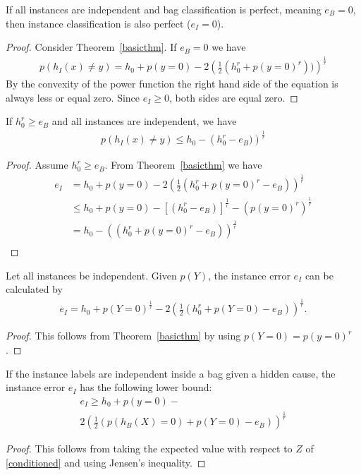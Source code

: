 \begin{corollarya}
If all instances are independent and bag classification is perfect, meaning $e_B=0$, then instance classification is also perfect ($e_I =0$).

\begin{proof}
Consider Theorem~\ref{basicthm}. If $e_B=0$ we have
\begin{align*}
p(h_I(x) \neq y) = h_0 + p(y=0) - 2 \left (\frac{1}{2} ( h_0^r + p(y=0)^r)) \right)^\frac{1}{r}
\end{align*}
By the convexity of the power function the right hand side of the equation is always less or equal zero.
Since $e_I \geq 0$, both sides are equal zero.
\end{proof}
\end{corollarya}

\begin{theorema}
    If $h_0^r  \geq e_B$ and all instances are independent, we have
\begin{align}
    p(h_I(x)\neq y) \leq h_0 - \left ( h_0^r - e_B) \right ) ^ \frac{1}{r}
\end{align}
\begin{proof}
    Assume $h_0^r  \geq e_B$.
    From Theorem~\ref{basicthm} we have
\begin{align*}
   e_I &= h_0 + p(y=0) - 2 \left (\frac{1}{2} ( h_0^r + p(y=0)^r - e_B) \right)^\frac{1}{r}\\
   &\leq h_0 + p(y=0) - \left [( h_0^r - e_B) \right]^\frac{1}{r}
   - \left ( p(y=0)^r \right )^\frac{1}{r}\\
   &= h_0 - \left (( h_0^r + p(y=0)^r - e_B) \right)^\frac{1}{r}\\
\end{align*}
\end{proof}
\end{theorema}

\begin{theorema}
Let all instances be independent. Given $p(Y)$, the instance error $e_I$ can be calculated by
\begin{align}
e_I = h_0 + p(Y=0)^\frac{1}{r} - 2 \left (\frac{1}{2} ( h_0^r + p(Y=0) - e_B) \right)^\frac{1}{r}.
\end{align}
\begin{proof}
    This follows from Theorem~\ref{basicthm} by using $p(Y=0)=p(y=0)^r$.
\end{proof}
\end{theorema}


\begin{theorema}
If the instance labels are independent inside a bag given a hidden cause, the instance
error $e_I$ has the following lower bound:
\begin{multline*}
e_I \geq h_0 + p(y=0) - \\
2 \left (\frac{1}{2} (p(h_B(X)=0) + p(Y=0) - e_B) \right)^\frac{1}{r}
\end{multline*}
\begin{proof}
    This follows from taking the expected value with respect to $Z$ of \eqref{conditioned} and using Jensen's
    inequality.
\end{proof}
\end{theorema}
